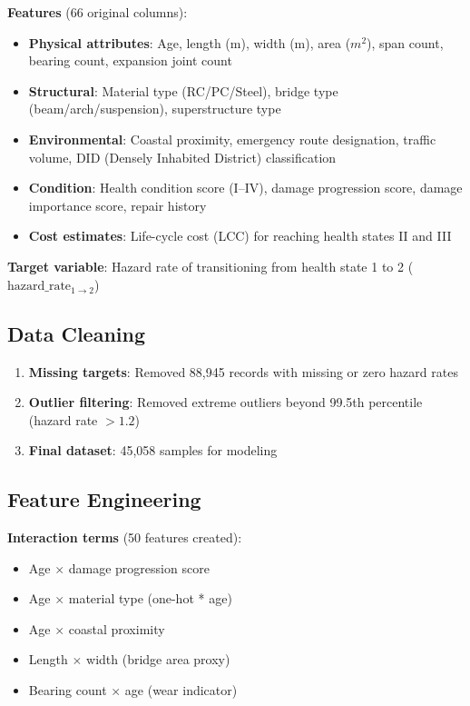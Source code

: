 \documentclass[twocolumn]{article}
\begin{document}
\textbf{Features} (66 original columns):
\begin{itemize}
\item \textbf{Physical attributes}: Age, length (m), width (m), area ($m^2$), span count, bearing count, expansion joint count
\item \textbf{Structural}: Material type (RC/PC/Steel), bridge type (beam/arch/suspension), superstructure type
\item \textbf{Environmental}: Coastal proximity, emergency route designation, traffic volume, DID (Densely Inhabited District) classification
\item \textbf{Condition}: Health condition score (I--IV), damage progression score, damage importance score, repair history
\item \textbf{Cost estimates}: Life-cycle cost (LCC) for reaching health states II and III
\end{itemize}

\textbf{Target variable}: Hazard rate of transitioning from health state 1 to 2 ($\text{hazard\_rate}_{1\to2}$)

\subsection{Data Cleaning}

\begin{enumerate}
\item \textbf{Missing targets}: Removed 88,945 records with missing or zero hazard rates
\item \textbf{Outlier filtering}: Removed extreme outliers beyond 99.5th percentile (hazard rate $> 1.2$)
\item \textbf{Final dataset}: 45,058 samples for modeling
\end{enumerate}

\subsection{Feature Engineering}

\textbf{Interaction terms} (50 features created):
\begin{itemize}
\item Age $\times$ damage progression score
\item Age $\times$ material type (one-hot * age)
\item Age $\times$ coastal proximity
\item Length $\times$ width (bridge area proxy)
\item Bearing count $\times$ age (wear indicator)
\end{itemize}
\end{document}
